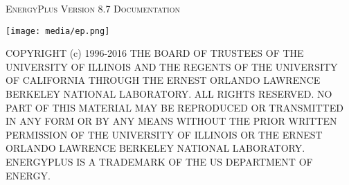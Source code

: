 \makeatletter
\begin{titlepage}
  \begin{center}
    {\scshape\LARGE EnergyPlus\texttrademark{} Version 8.7 Documentation \par}
    \vspace{1.5cm}
    {\bfseries\huge \@title \par}
    \vspace{1.5cm}
    {\Large\itshape \@author \par}
    \vspace{2.5cm}
    \texttt{[image: media/ep.png]}\par\vspace{1cm}
    \vfill

    {\large \@date \par}
    \vspace{1.5cm}
  \end{center}
  {\small
COPYRIGHT (c) 1996-2016 THE BOARD OF TRUSTEES OF THE UNIVERSITY OF ILLINOIS AND THE REGENTS OF THE UNIVERSITY OF CALIFORNIA THROUGH THE ERNEST ORLANDO LAWRENCE BERKELEY NATIONAL LABORATORY. ALL RIGHTS RESERVED. NO PART OF THIS MATERIAL MAY BE REPRODUCED OR TRANSMITTED IN ANY FORM OR BY ANY MEANS WITHOUT THE PRIOR WRITTEN PERMISSION OF THE UNIVERSITY OF ILLINOIS OR THE ERNEST ORLANDO LAWRENCE BERKELEY NATIONAL LABORATORY. ENERGYPLUS IS A TRADEMARK OF THE US DEPARTMENT OF ENERGY.
  }
\end{titlepage}
\makeatother

{
\setcounter{tocdepth}{2}
\tableofcontents
}

\hypertarget{generated-toc}{}
